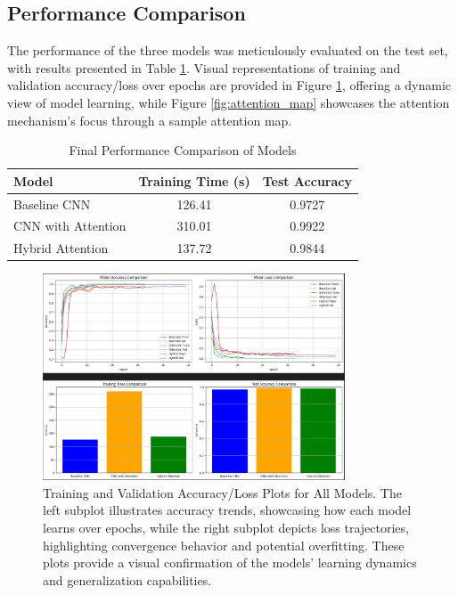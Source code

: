 \documentclass[12pt]{article}
\begin{document}
\subsection{Performance Comparison}
The performance of the three models was meticulously evaluated on the test set, with results presented in Table \ref{tab:performance_partb}. Visual representations of training and validation accuracy/loss over epochs are provided in Figure \ref{fig:plots}, offering a dynamic view of model learning, while Figure \ref{fig:attention_map} showcases the attention mechanism's focus through a sample attention map.

\begin{table}[h]
    \centering
    \caption{Final Performance Comparison of Models}
    \label{tab:performance_partb}
    \begin{tabular}{lcc}
        \toprule
        \textbf{Model} & \textbf{Training Time (s)} & \textbf{Test Accuracy} \\
        \midrule
        Baseline CNN & 126.41 & 0.9727 \\
        CNN with Attention & 310.01 & 0.9922 \\
        Hybrid Attention & 137.72 & 0.9844 \\
        \bottomrule
    \end{tabular}
\end{table}

\begin{figure}[H]
    \centering
    \includegraphics[width=0.8\textwidth]{accuracy_loss_plots.png}
    \caption{Training and Validation Accuracy/Loss Plots for All Models. The left subplot illustrates accuracy trends, showcasing how each model learns over epochs, while the right subplot depicts loss trajectories, highlighting convergence behavior and potential overfitting. These plots provide a visual confirmation of the models' learning dynamics and generalization capabilities.}
    \label{fig:plots}
\end{figure}
\end{document}
